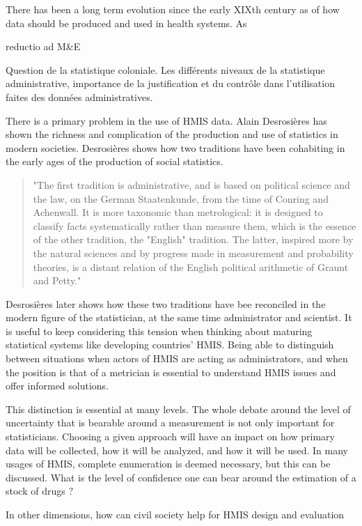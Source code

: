 \documentclass[a4paper,11pt,final,twoside]{article}
\begin{document}
There has been a long term evolution since the early XIXth century as of how data should be produced and used in health systems. As 


reductio ad M\&E


Question de la statistique coloniale. Les différents niveaux de la statistique administrative, importance de la justification et du contrôle dans l'utilisation faites des données administratives.

There is a primary problem in the use of HMIS data. Alain Desrosières has shown the richness and complication of the production and use of statistics in modern societies. Desrosières shows how two traditions have been cohabiting in the early ages of the production of social statistics\cite{admin_savant}. 

\begin{quote}
"The first tradition is administrative, and is based on political science and the law, on the German Staatenkunde, from the time of Conring and Achenwall. It is more taxonomic than metrological: it is designed to classify facts systematically rather than measure them, which is the essence of the other tradition, the "English" tradition. The latter, inspired more by the natural sciences and by progress made in measurement and probability theories, is a distant relation of the English political arithmetic of Graunt and Petty."
\end{quote}

Desrosières later shows how these two traditions have bee reconciled in the modern figure of the statistician, at the same time administrator and scientist. It is useful to keep considering this tension when thinking about maturing statistical systems like developing countries' HMIS. Being able to distinguish between situations when actors of HMIS are acting as administrators, and when the position is that of a metrician is essential to understand HMIS issues and offer informed solutions. 

This distinction is essential at many levels. The whole debate around the level of uncertainty that is bearable around a measurement is not only important for statisticians. Choosing a given approach will have an impact on how primary data will be collected, how it will be analyzed, and how it will be used. In many usages of HMIS, complete enumeration is deemed necessary, but this can be discussed. What is the level of confidence one can bear around the estimation of a stock of drugs ?

In other dimensions, how can civil society help for HMIS design and evaluation
\end{document}
